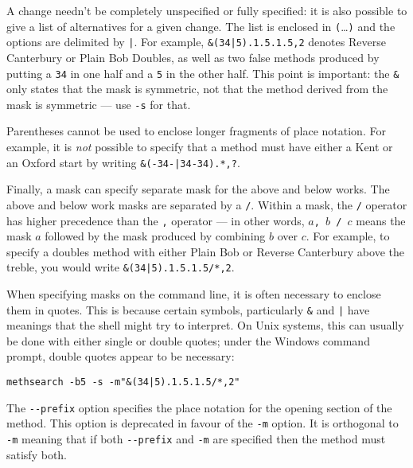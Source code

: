 \documentclass[a4paper,11pt,oneside]{book}
\makeatletter
\newcommand{\loid}[1]{\index{#1@{\hspace*{-\loptwidth}\texttt{--#1}}|ulink}}
\newcommand{\symidx}[2]{} %
\makeatother
\begin{document}
A change needn't be completely unspecified or fully specified: it is also
possible to give a list of alternatives for a given change.  The list is 
enclosed in \verb+(+\ldots\verb+)+ 
and the options are delimited by \verb+|+.\symidx{"|}{method mask}  
For example, \verb+&(34|5).1.5.1.5,2+ denotes Reverse Canterbury
or Plain Bob Doubles, as well as two false methods produced by putting a
\verb+34+ in one half and a \verb+5+ in the other half.  This point is 
important: the \verb+&+ only states that the mask is symmetric, not that
the method derived from the mask is symmetric --- use \verb+-s+ for that.

Parentheses cannot be used to enclose longer fragments of place notation.
For example, it is \textit{not} possible to specify that a method must have 
either a Kent or an Oxford 
start by writing \verb+&(-34-|34-34).*,?+.

Finally, a mask can specify separate mask for the above
and below works.  The above and below 
work masks are separated by a \verb+/+.\symidx{/}{method mask}
Within a mask, the \verb+/+ operator has higher 
precedence than the 
\verb+,+ operator --- in other words, 
\texttt{$a$, $b$ / $c$} means the mask $a$
followed by the mask produced by combining $b$ over $c$.  For example,
to specify a doubles method with either Plain Bob or Reverse Canterbury
above the treble, you would write \verb+&(34|5).1.5.1.5/*,2+.

When specifying masks on the command line, it is often necessary to enclose 
them in quotes.
This is because certain symbols, particularly \verb+&+ and
\verb+|+ have meanings that the shell might try to interpret.  On Unix systems,
this can usually be done with either single or double quotes; under the 
Windows command prompt, double quotes appear to be necessary:

\begin{Verbatim}
methsearch -b5 -s -m"&(34|5).1.5.1.5/*,2"
\end{Verbatim}

The \verb+--prefix+ option\loid{prefix} specifies the place notation for the
opening section of the method.  This option is deprecated in favour
of the \verb+-m+ option.  It is orthogonal to \verb+-m+ meaning that
if both \verb+--prefix+ and \verb+-m+ are specified then the method must
satisfy both.
\end{document}
